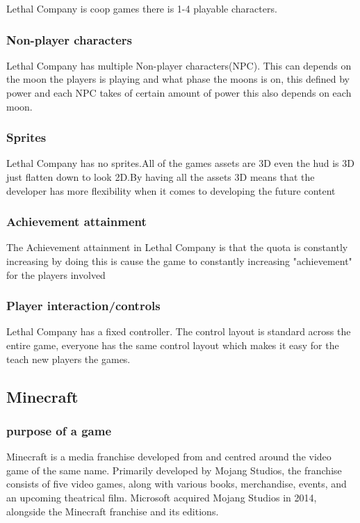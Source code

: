 \documentclass{article}
\begin{document}
Lethal Company is coop games there is 1-4 playable characters.

\subsubsection{Non-player characters}

Lethal Company has multiple Non-player characters(NPC). This can depends on the moon the players is playing and what phase the moons is on, this defined by power and each NPC takes of certain amount of power this also depends on each moon.

\subsubsection{Sprites}

Lethal Company has no sprites.All of the games assets are 3D even the hud is 3D just flatten down to look 2D.By having all the assets 3D means that the developer has more flexibility when it comes to developing the future content

\subsubsection{Achievement attainment}

The Achievement attainment in Lethal Company is that the quota is constantly increasing by doing this is cause the game to constantly increasing "achievement" for the players involved 

\subsubsection{Player interaction/controls} 

Lethal Company has a fixed controller. The control layout is standard across the entire game, everyone has the same control layout which makes it easy for the teach new players the games. 


\break

\subsection{Minecraft}
\subsubsection{purpose of a game}

Minecraft is a media franchise developed from and centred around the video game of the same name. Primarily developed by Mojang Studios, the franchise consists of five video games, along with various books, merchandise, events, and an upcoming theatrical film. Microsoft acquired Mojang Studios in 2014, alongside the Minecraft franchise and its editions. 
\end{document}
